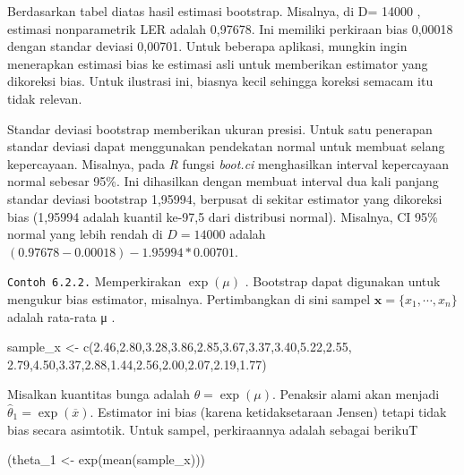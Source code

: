\documentclass[
]{book}
\newenvironment{Shaded}{\begin{snugshade}}{\end{snugshade}}
\newcommand{\FloatTok}[1]{\textcolor[rgb]{0.00,0.00,0.81}{#1}}
\newcommand{\FunctionTok}[1]{\textcolor[rgb]{0.00,0.00,0.00}{#1}}
\newcommand{\NormalTok}[1]{#1}
\newcommand{\OtherTok}[1]{\textcolor[rgb]{0.56,0.35,0.01}{#1}}
\begin{document}
Berdasarkan tabel diatas hasil estimasi bootstrap. Misalnya, di D= 14000 , estimasi nonparametrik LER adalah 0,97678. Ini memiliki perkiraan bias 0,00018 dengan standar deviasi 0,00701. Untuk beberapa aplikasi, mungkin ingin menerapkan estimasi bias ke estimasi asli untuk memberikan estimator yang dikoreksi bias. Untuk ilustrasi ini, biasnya kecil sehingga koreksi semacam itu tidak relevan.

Standar deviasi bootstrap memberikan ukuran presisi. Untuk satu penerapan standar deviasi dapat menggunakan pendekatan normal untuk membuat selang kepercayaan. Misalnya, pada \emph{R} fungsi \emph{boot.ci} menghasilkan interval kepercayaan normal sebesar 95\%. Ini dihasilkan dengan membuat interval dua kali panjang standar deviasi bootstrap 1,95994, berpusat di sekitar estimator yang dikoreksi bias (1,95994 adalah kuantil ke-97,5 dari distribusi normal). Misalnya, CI 95\% normal yang lebih rendah di \(D= 14000\) adalah \((0.97678-0.00018)- 1.95994*0.00701\).

\texttt{Contoh\ 6.2.2.} Memperkirakan \(\exp(\mu)\) . Bootstrap dapat digunakan untuk mengukur bias estimator, misalnya. Pertimbangkan di sini sampel \(\mathbf{x}=\{x_1,\cdots,x_n\}\) adalah rata-rata μ .

\begin{Shaded}
\begin{Highlighting}[]
\NormalTok{sample\_x }\OtherTok{\textless{}{-}} \FunctionTok{c}\NormalTok{(}\FloatTok{2.46}\NormalTok{,}\FloatTok{2.80}\NormalTok{,}\FloatTok{3.28}\NormalTok{,}\FloatTok{3.86}\NormalTok{,}\FloatTok{2.85}\NormalTok{,}\FloatTok{3.67}\NormalTok{,}\FloatTok{3.37}\NormalTok{,}\FloatTok{3.40}\NormalTok{,}\FloatTok{5.22}\NormalTok{,}\FloatTok{2.55}\NormalTok{,}
              \FloatTok{2.79}\NormalTok{,}\FloatTok{4.50}\NormalTok{,}\FloatTok{3.37}\NormalTok{,}\FloatTok{2.88}\NormalTok{,}\FloatTok{1.44}\NormalTok{,}\FloatTok{2.56}\NormalTok{,}\FloatTok{2.00}\NormalTok{,}\FloatTok{2.07}\NormalTok{,}\FloatTok{2.19}\NormalTok{,}\FloatTok{1.77}\NormalTok{)}
\end{Highlighting}
\end{Shaded}

Misalkan kuantitas bunga adalah \(\theta=\exp(\mu)\). Penaksir alami akan menjadi \(\widehat{\theta}_1=\exp(\overline{x})\). Estimator ini bias (karena ketidaksetaraan Jensen) tetapi tidak bias secara asimtotik. Untuk sampel, perkiraannya adalah sebagai berikuT

\begin{Shaded}
\begin{Highlighting}[]
\NormalTok{(theta\_1 }\OtherTok{\textless{}{-}} \FunctionTok{exp}\NormalTok{(}\FunctionTok{mean}\NormalTok{(sample\_x)))}
\end{Highlighting}
\end{Shaded}
\end{document}
